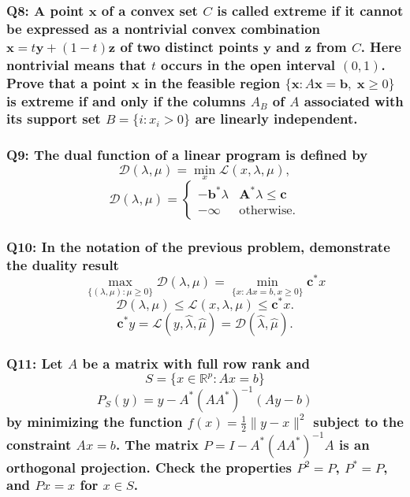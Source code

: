 \documentclass{article}
\begin{document}
\subsubsection*{Q8: A point \(\mathbf{x}\) of a convex set \(C\) is called extreme if it cannot be expressed as a nontrivial convex combination \(\mathbf{x} = t\mathbf{y} + (1 - t)\mathbf{z}\) of two distinct points \(\mathbf{y}\) and \(\mathbf{z}\) from \(C\). Here nontrivial means that \(t\) occurs in the open interval \((0, 1)\). Prove that a point \(\mathbf{x}\) in the feasible region \(\{\mathbf{x} : A\mathbf{x} = \mathbf{b}, \; \mathbf{x} \geq 0\}\) is extreme if and only if the columns \(A_B\) of \(A\) associated with its support set \(B = \{i : x_i > 0\}\) are linearly independent.}

\subsubsection*{Q9: The dual function of a linear program is defined by
\[ \mathcal{D}(\lambda, \mu) = \min_x \mathcal{L}(x, \lambda, \mu), \]
\[ \mathcal{D}(\lambda, \mu) = \begin{cases} 
-\mathbf{b}^* \lambda & \mathbf{A}^* \lambda \leq \mathbf{c} \\
-\infty & \text{otherwise}.
\end{cases} \]}

\subsubsection*{Q10: In the notation of the previous problem, demonstrate the duality result
\[
\max_{\{(\lambda, \mu) : \mu \geq 0\}} \mathcal{D}(\lambda, \mu) = \min_{\{x : A x = b, x \geq 0\}} \mathbf{c}^* x
\]
\[
\mathcal{D}(\lambda, \mu) \leq \mathcal{L}(x, \lambda, \mu) \leq \mathbf{c}^* x.
\]
\[
\mathbf{c}^* y = \mathcal{L}(y, \hat{\lambda}, \hat{\mu}) = \mathcal{D}(\hat{\lambda}, \hat{\mu}).
\]}

\subsubsection*{Q11: Let \(A\) be a matrix with full row rank and
\[ S = \{x \in \mathbb{R}^p : Ax = b\} \]
\[ P_S(y) = y - A^* (AA^*)^{-1} (Ay - b) \]
by minimizing the function \(f(x) = \frac{1}{2} \|y - x\|^2\) subject to the constraint \(Ax = b\). The matrix \(P = I - A^* (AA^*)^{-1} A\) is an orthogonal projection. Check the properties \(P^2 = P\), \(P^* = P\), and \(Px = x\) for \(x \in S\).}
\end{document}
